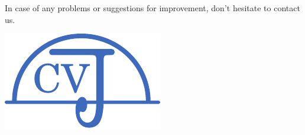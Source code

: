 \documentclass[a4paper]{scrreprt}
\begin{document}
In case of any problems or suggestions for improvement, don't hesitate to contact us.

\vspace{10em}
\begin{center}
  \includegraphics[width=0.5\linewidth]{img/logoV2blue}
\end{center}
\end{document}
